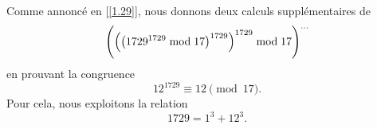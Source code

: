 \noindent%
Comme annoncé en [\ref{1.29}], nous donnons deux calculs supplémentaires de
%
\begin{equation*}
  \Biggl(\Bigl(\bigl(1729^{1729} \bmod{17}\bigr)^{1729} \Bigr)^{1729} \bmod{17}\Biggr)^{\mathbf{\dots}} 
\end{equation*}
%
en prouvant la congruence
%
\begin{equation*}
  12^{1729} \equiv 12 \pmod{17}.
\end{equation*}
%
Pour cela, nous exploitons la relation 
%
\begin{equation}
  1729 = 1^3 + 12^3.
\end{equation} 
%
